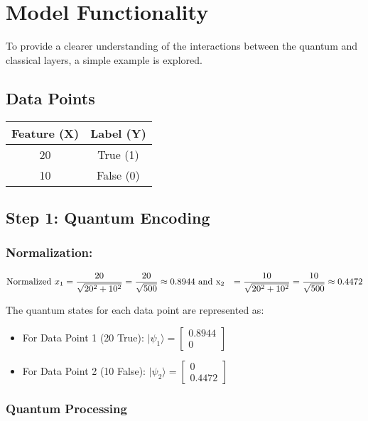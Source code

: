 \documentclass[a4paper]{article}
\begin{document}
\section{Model Functionality}To provide a clearer understanding of the interactions between the quantum and classical layers, a simple example is explored.

\subsection*{Data Points}
\begin{tabular}{|c|c|}
	\hline
	\textbf{Feature (X) } & \textbf{Label (Y)} \\
	\hline
	20 & True (1) \\
	\hline
	10 & False (0) \\
	\hline
\end{tabular}

\subsection{Step 1: Quantum Encoding}

\subsubsection*{Normalization:}
\begin{align*}
	\text{Normalized } x_1 & = \frac{20}{\sqrt{20^2 + 10^2}} = \frac{20}{\sqrt{500}} \approx 0.8944 \text{      and      }
	\text x_2 & = \frac{10}{\sqrt{20^2 + 10^2}} = \frac{10}{\sqrt{500}} \approx 0.4472
\end{align*}

The quantum states for each data point are represented as:

\begin{itemize}
	\item[] For Data Point 1 (20 True): $ |\psi_1\rangle = \begin{bmatrix} 0.8944 \\ 0 \end{bmatrix} $
	
	\item[] For Data Point 2 (10 False): $ |\psi_2\rangle = \begin{bmatrix} 0 \\ 0.4472 \end{bmatrix} $
\end{itemize}
\subsubsection{Quantum Processing}
\end{document}
